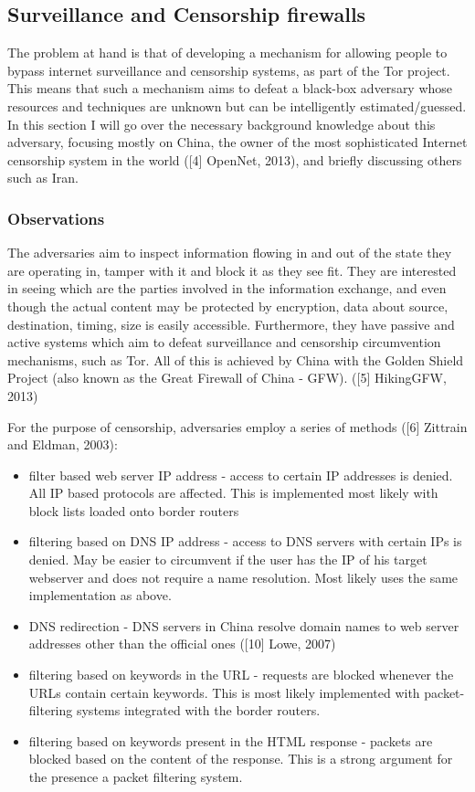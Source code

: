 \documentclass[11pt]{article} %
\begin{document}
\subsection{Surveillance and Censorship firewalls}

The problem at hand is that of developing a mechanism for allowing people to bypass internet surveillance and censorship systems, as part of  the Tor project. This means that such a mechanism aims to defeat a black-box adversary whose resources and techniques are unknown but can be intelligently estimated/guessed. In this section I will go over the necessary background knowledge about this adversary, focusing mostly on China, the owner of the most sophisticated Internet censorship system in the world ([4] OpenNet, 2013), and briefly discussing others such as Iran.

\subsubsection{Observations}

The adversaries aim to inspect information flowing in and out of the state they are operating in, tamper with it and block it as they see fit. They are interested in seeing which are the parties involved in the information exchange, and even though the actual content may be protected by encryption, data about source, destination, timing, size is easily accessible. Furthermore, they have passive and active systems which aim to defeat surveillance and censorship circumvention mechanisms, such as Tor. All of this is achieved by China with the Golden Shield Project (also known as the Great Firewall of China - GFW). ([5] HikingGFW, 2013)

For the purpose of censorship, adversaries employ a series of methods ([6] Zittrain and Eldman, 2003):

\begin{itemize}
\item filter based web server IP address - access to certain IP addresses is denied. All IP based protocols are affected. This is implemented most likely with block lists loaded onto border routers
\item filtering based on DNS IP address - access to DNS servers with certain IPs is denied. May be easier to circumvent if the user has the IP of his target webserver and does not require a name resolution. Most likely uses the same implementation as above.
\item DNS redirection - DNS servers in China resolve domain names to web server addresses other than the official ones ([10] Lowe, 2007)
\item filtering based on keywords in the URL - requests are blocked whenever the URLs contain certain keywords. This is most likely implemented with packet-filtering systems integrated with the border routers.
\item filtering based on keywords present in the HTML response - packets are blocked based on the content of the response. This is a strong argument for the presence a packet filtering system.
\end{itemize}
\end{document}
